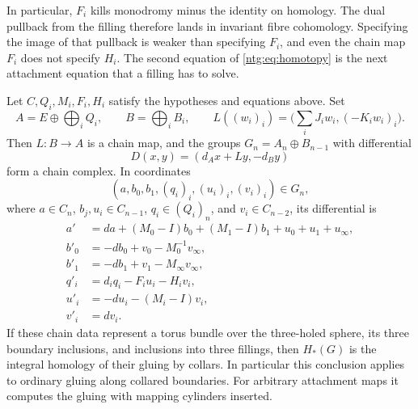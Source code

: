 In particular, $F_i$ kills monodromy minus the identity on homology.
The dual pullback from the filling therefore lands in invariant fibre
cohomology. Specifying the image of that pullback is weaker than
specifying $F_i$, and even the chain map $F_i$ does not specify $H_i$.
The second equation of \eqref{ntg:eq:homotopy} is the next attachment
equation that a filling has to solve.

\begin{theorem}\label{ntg:thm:gluing}
Let $C,Q_i,M_i,F_i,H_i$ satisfy the hypotheses and equations above.
Set
\[
 A=E\oplus\bigoplus_iQ_i,\qquad B=\bigoplus_i B_i,
 \qquad L((w_i)_i)=\bigl(\textstyle\sum_iJ_iw_i,(-K_iw_i)_i\bigr).
\]
Then $L:B\to A$ is a chain map, and the groups
$G_n=A_n\oplus B_{n-1}$ with differential
\begin{equation}\label{ntg:eq:cone}
 D(x,y)=(d_Ax+Ly,-d_By)
\end{equation}
form a chain complex. In coordinates
\[
 (a,b_0,b_1,(q_i)_i,(u_i)_i,(v_i)_i)\in G_n,
\]
where $a\in C_n$, $b_j,u_i\in C_{n-1}$,
$q_i\in(Q_i)_n$, and $v_i\in C_{n-2}$, its differential is
\begin{equation}\label{ntg:eq:full-boundary}
\begin{aligned}
 a'&=da+(M_0-I)b_0+(M_1-I)b_1+u_0+u_1+u_\infty,\\
 b'_0&=-db_0+v_0-M_0^{-1}v_\infty,\\
 b'_1&=-db_1+v_1-M_\infty v_\infty,\\
 q'_i&=d_iq_i-F_iu_i-H_iv_i,\\
 u'_i&=-du_i-(M_i-I)v_i,\\
 v'_i&=dv_i.
\end{aligned}
\end{equation}
If these chain data represent a torus bundle over the three-holed
sphere, its three boundary inclusions, and inclusions into three
fillings, then $H_*(G)$ is the integral homology of their gluing by
collars. In particular this conclusion applies to ordinary gluing
along collared boundaries. For arbitrary attachment maps it computes
the gluing with mapping cylinders inserted.
\end{theorem}
